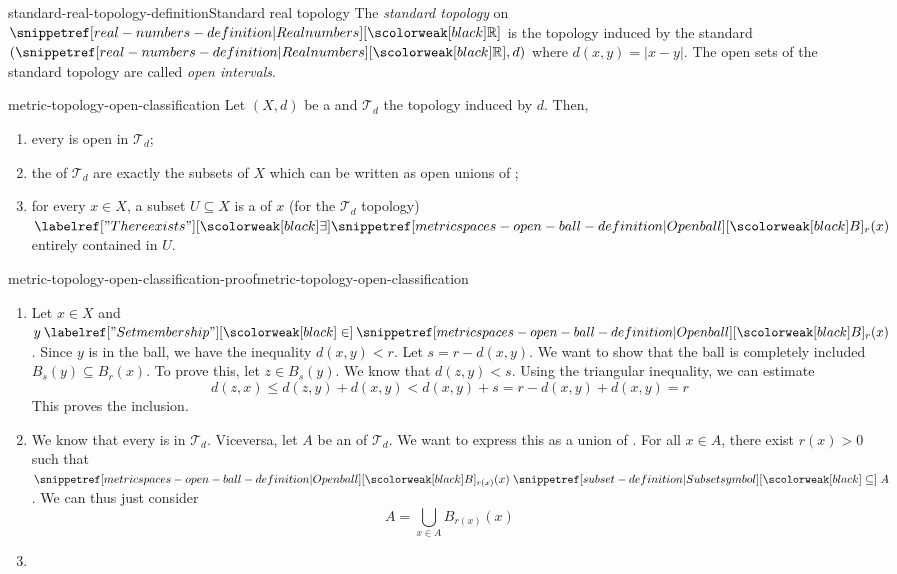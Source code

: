 \documentclass[preview]{standalone}
\begin{document}
\begin{snippetdefinition}{standard-real-topology-definition}{Standard real topology}
    The \emph{standard topology} on \(\realnumbers\) is the topology induced by the standard \metricspace
    \((\realnumbers, d)\) where \(d(x,y) = |x - y|\).
    The open sets of the standard topology are called \textit{open intervals}.
\end{snippetdefinition}

\begin{snippetproposition}{metric-topology-open-classification}{}
    Let \((X, d)\) be a \metricspace and \(\mathcal{T}_d\) the topology induced by \(d\). Then,
    \begin{enumerate}
        \item every \openball is open in \(\mathcal{T}_d\);
        \item the  of \(\mathcal{T}_d\)
        are exactly the subsets of \(X\) which can be written as open unions of ;
        \item for every \(x\in X\), a subset \(U \subseteq X\)
        is a \neighborhood of \(x\) (for the \(\mathcal{T}_d\) topology) \ifandonlyif
        \(\exists \ball_r(x)\) entirely contained in \(U\).
    \end{enumerate}
\end{snippetproposition}

\begin{snippetproof}{metric-topology-open-classification-proof}{metric-topology-open-classification}{}
    \begin{enumerate}
        \item Let \(x\in X\) and \(y \in \ball_r(x)\).
        Since \(y\) is in the ball, we have the inequality
        \(d(x,y) < r\). Let \(s = r - d(x,y)\).
        We want to show that the ball is completely included \(B_s(y) \subseteq B_r(x)\).
        To prove this, let \(z \in B_s(y)\). We know that \(d(z, y) < s\).
        Using the triangular inequality, we can estimate
        \[
            d(z,x) \leq d(z,y) + d(x, y) < d(x,y) + s
            = r- d(x,y) + d(x,y) = r
        \]
        This proves the inclusion.
        \item We know that every \openball is 
        in \(\mathcal{T}_d\). Viceversa, let \(A\) be an 
        of \(\mathcal{T}_d\). We want to express this as a union of .
        For all \(x \in A\), there exist \(r(x) > 0\) such that \(\ball_{r(x)}(x) \subseteq A\).
        We can thus just consider
        \[
            A = \bigcup_{x\in A} B_{r(x)}(x)
        \]
        \item {}
    \end{enumerate}
\end{snippetproof}
\end{document}
